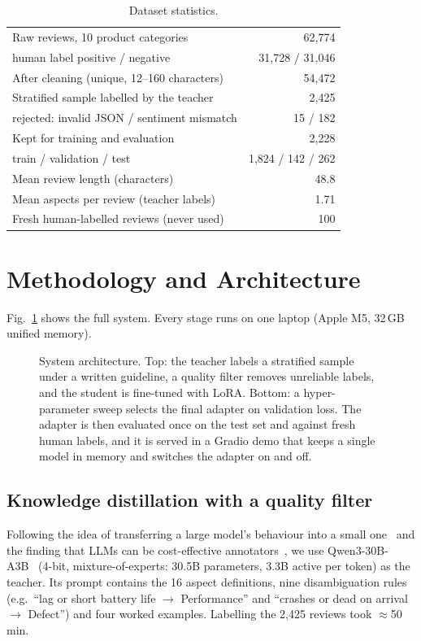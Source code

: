 \documentclass[journal]{IEEEtran}
\begin{document}
\begin{table}[t]
\centering
\caption{Dataset statistics.}
\label{tab:data}
\setlength{\tabcolsep}{4pt}
\begin{tabular}{lr}
\toprule
Raw reviews, 10 product categories & 62{,}774 \\
\quad human label positive / negative & 31{,}728 / 31{,}046 \\
After cleaning (unique, 12--160 characters) & 54{,}472 \\
Stratified sample labelled by the teacher & 2{,}425 \\
\quad rejected: invalid JSON / sentiment mismatch & 15 / 182 \\
Kept for training and evaluation & 2{,}228 \\
\quad train / validation / test & 1{,}824 / 142 / 262 \\
Mean review length (characters) & 48.8 \\
Mean aspects per review (teacher labels) & 1.71 \\
Fresh human-labelled reviews (never used) & 100 \\
\bottomrule
\end{tabular}
\end{table}

\section{Methodology and Architecture}

Fig.~\ref{fig:pipeline} shows the full system. Every stage runs on one laptop (Apple M5, 32\,GB unified memory).

\begin{figure}[t]
\centering
\resizebox{\textwidth}{!}{}
\caption{System architecture. Top: the teacher labels a stratified sample under a written guideline, a quality filter
removes unreliable labels, and the student is fine-tuned with LoRA. Bottom: a hyper-parameter sweep selects the final
adapter on validation loss. The adapter is then evaluated once on the test set and against fresh human labels, and it is
served in a Gradio demo that keeps a single model in memory and switches the adapter on and off.}
\label{fig:pipeline}
\end{figure}

\subsection{Knowledge distillation with a quality filter}
Following the idea of transferring a large model's behaviour into a small one~\cite{hinton2015distilling,hsieh2023distilling}
and the finding that LLMs can be cost-effective annotators~\cite{gilardi2023chatgpt}, we use
Qwen3-30B-A3B~\cite{qwen3} (4-bit, mixture-of-experts: 30.5B parameters, 3.3B active per token) as the teacher. Its prompt contains the
16 aspect definitions, nine disambiguation rules (e.g.\ ``lag or short battery life $\rightarrow$ Performance'' and
``crashes or dead on arrival $\rightarrow$ Defect'') and four worked examples. Labelling the 2{,}425 reviews took
$\approx$50\,min.
\end{document}
